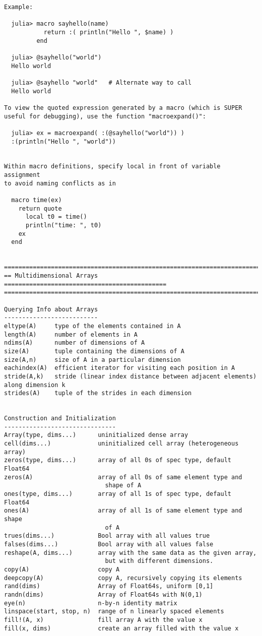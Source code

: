 \documentclass[12pt]{article}
\theoremstyle{plain}
\theoremstyle{definition}
\theoremstyle{remark}
\begin{document}
\begin{lstlisting}
Example:

  julia> macro sayhello(name)
           return :( println("Hello ", $name) )
         end

  julia> @sayhello("world")
  Hello world

  julia> @sayhello "world"   # Alternate way to call
  Hello world

To view the quoted expression generated by a macro (which is SUPER
useful for debugging), use the function "macroexpand()":

  julia> ex = macroexpand( :(@sayhello("world")) )
  :(println("Hello ", "world"))


Within macro definitions, specify local in front of variable assignment
to avoid naming conflicts as in

  macro time(ex)
    return quote
      local t0 = time()
      println("time: ", t0)
    ex
  end


========================================================================
== Multidimensional Arrays =============================================
========================================================================

Querying Info about Arrays
--------------------------
eltype(A)     type of the elements contained in A
length(A)     number of elements in A
ndims(A)      number of dimensions of A
size(A)       tuple containing the dimensions of A
size(A,n)     size of A in a particular dimension
eachindex(A)  efficient iterator for visiting each position in A
stride(A,k)   stride (linear index distance between adjacent elements) along dimension k
strides(A)    tuple of the strides in each dimension


Construction and Initialization
-------------------------------
Array(type, dims...)      uninitialized dense array
cell(dims...)             uninitialized cell array (heterogeneous array)
zeros(type, dims...)      array of all 0s of spec type, default Float64
zeros(A)                  array of all 0s of same element type and
                            shape of A
ones(type, dims...)       array of all 1s of spec type, default Float64
ones(A)                   array of all 1s of same element type and shape
                            of A
trues(dims...)            Bool array with all values true
falses(dims...)           Bool array with all values false
reshape(A, dims...)       array with the same data as the given array,
                            but with different dimensions.
copy(A)                   copy A
deepcopy(A)               copy A, recursively copying its elements
rand(dims)                Array of Float64s, uniform [0,1]
randn(dims)               Array of Float64s with N(0,1)
eye(n)                    n-by-n identity matrix
linspace(start, stop, n)  range of n linearly spaced elements
fill!(A, x)               fill array A with the value x
fill(x, dims)             create an array filled with the value x



\end{lstlisting}
\end{document}
